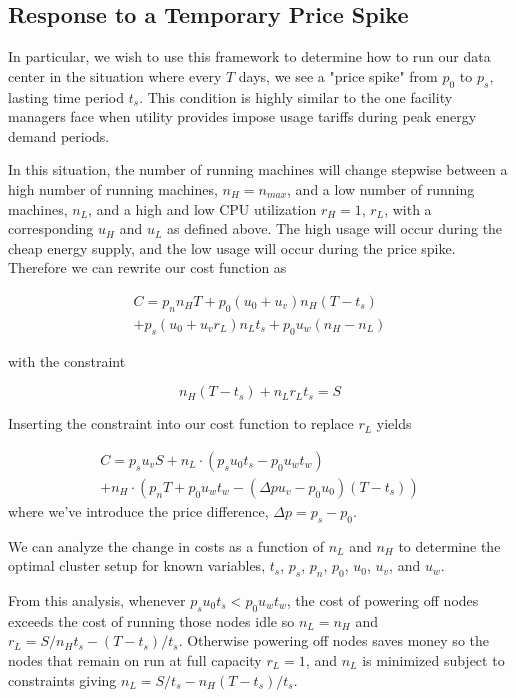 \documentclass[letterpaper,twocolumn,10pt]{article}
\begin{document}
\subsection{Response to a Temporary Price Spike}

In particular, we wish to use this framework to determine how to run our data center in the situation where every $T$ days, we see a "price spike" from $p_0$ to $p_s$, lasting time period $t_s$.  This condition is highly similar to the one facility managers face when utility provides impose usage tariffs during peak energy demand periods.

In this situation, the number of running machines will change stepwise between a high number of running machines, $n_H=n_{max}$, and a low number of running machines, $n_L$, and a high and low CPU utilization $r_H=1$, $r_L$, with a corresponding $u_H$ and $u_L$ as defined above.  The high usage will occur during the cheap energy supply, and the low usage will occur during the price spike.  Therefore we can rewrite our cost function as 

\begin{equation}
\begin{multlined}
	C = p_n n_H T + p_0 (u_0 + u_v) n_H (T-t_s) \\
	+ p_s (u_0 + u_v r_L) n_L t_s + p_0 u_w (n_H-n_L)
\end{multlined}
\end{equation}

with the constraint

\begin{equation}
n_H (T-t_s) + n_L r_L t_s = S
\end{equation}

Inserting the constraint into our cost function to replace $r_L$ yields 

\begin{equation}
\begin{multlined}
C = p_s u_v S + n_L \cdot( p_s u_0 t_s - p_0 u_w t_w) \\
+ n_H \cdot (p_n T + p_0 u_w t_w -(\Delta p u_v - p_0 u_0)(T-t_s))
\end{multlined}
\end{equation}
where we've introduce the price difference, $\Delta p = p_s - p_0$.

We can analyze the change in costs as a function of $n_L$ and $n_H$ to determine the optimal cluster setup for known variables, $t_s$, $p_s$, $p_n$, $p_0$, $u_0$, $u_v$, and $u_w$. 

From this analysis, whenever $ p_s u_0 t_s < p_0 u_w t_w$, the cost of powering off nodes exceeds the cost of running those nodes idle so $n_L = n_H$ and $r_L = S/n_H t_s - (T-t_s)/t_s$. Otherwise powering off nodes saves money so the nodes that remain on run at full capacity $r_L = 1$, and $n_L$ is minimized subject to constraints giving $n_L = S/t_s - n_H(T-t_s)/t_s$.
\end{document}
